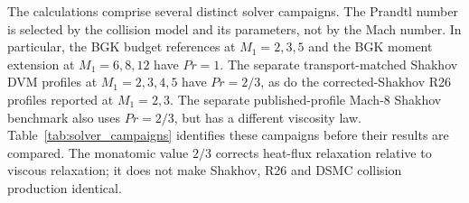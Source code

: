 \documentclass[lineno,paper]{JFM-FLM_Au}
\newenvironment{revision}{\nolinenumbers\begin{tcolorbox}[breakable,colback=revisionyellow,colframe=revisionyellow,boxrule=0pt,arc=0pt,left=5pt,right=5pt,top=5pt,bottom=5pt,before skip=6pt,after skip=6pt]\captionsetup{width=\linewidth}}{\end{tcolorbox}\linenumbers}
\newenvironment{revision}{}{}
\begin{document}
\begin{revision}
The calculations comprise several distinct solver campaigns. The Prandtl number is selected by the collision model and its parameters, not by the Mach number. In particular, the BGK budget references at $M_1=2,3,5$ and the BGK moment extension at $M_1=6,8,12$ have $Pr=1$. The separate transport-matched Shakhov DVM profiles at $M_1=2,3,4,5$ have $Pr=2/3$, as do the corrected-Shakhov R26 profiles reported at $M_1=2,3$. The separate published-profile Mach-8 Shakhov benchmark also uses $Pr=2/3$, but has a different viscosity law. Table~\ref{tab:solver_campaigns} identifies these campaigns before their results are compared. The monatomic value $2/3$ corrects heat-flux relaxation relative to viscous relaxation; it does not make Shakhov, R26 and DSMC collision production identical.
\end{revision}
\end{document}

